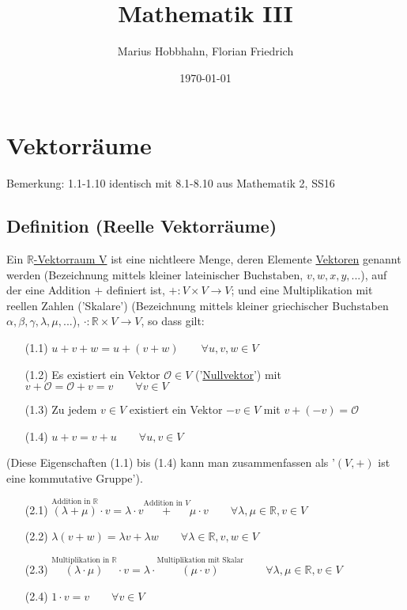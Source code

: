 \documentclass[12pt,titlepage, pdf]{article}
\title{Mathematik III}
\date{\today}
\author{Marius Hobbhahn, Florian Friedrich}
\newcommand{\R}{\mathds{R}}
\renewcommand{\>}{\rightarrow}
\renewcommand{\*}{\cdot}
\renewcommand{\O}{\mathcal{O}}
\begin{document}
	\maketitle
	\tableofcontents
	\newpage
	\section{Vektorräume}
	\small{Bemerkung: 1.1-1.10 identisch mit 8.1-8.10 aus Mathematik 2, SS16}
	\subsection{Definition (Reelle Vektorräume)}
	\label{1.1}
	Ein \underline{$\R$-Vektorraum V} ist eine nichtleere Menge, deren Elemente \underline{Vektoren} genannt werden (Bezeichnung mittels kleiner lateinischer Buchstaben, $v,w,x,y,...$), auf der eine Addition $+$ definiert ist, $+\colon V\times V\>V$; und eine Multiplikation mit reellen Zahlen ('Skalare') (Bezeichnung mittels kleiner griechischer Buchstaben $\alpha, \beta, \gamma, \lambda,\mu,...$), $\*\colon\R\times V\>V$, so dass gilt:
	\begin{itemize}
		\item[(1.1)] \label{1.1(1.1)}$u+v+w=u+(v+w)\qquad\forall u,v,w\in V$
		\item[(1.2)] \label{1.1(1.2)}Es existiert ein Vektor $\O\in V$ ('\underline{Nullvektor}') mit $v+\O=\O+v=v\qquad\forall v\in V$
		\item[(1.3)] \label{1.1(1.3)} Zu jedem $v\in V$ existiert ein Vektor $-v\in V$ mit $v+(-v)=\O$
		\item[(1.4)] $u+v=v+u\qquad\forall u,v\in V$
	\end{itemize}
	(Diese Eigenschaften (1.1) bis (1.4) kann man zusammenfassen als '$(V,+)$ ist eine kommutative Gruppe').
	\begin{itemize}
		\item[(2.1)] \label{1.1(2.1)}$\overset{\textrm{Addition in }\R}{(\lambda+\mu)}\*v=\lambda\*v\overset{\textrm{Addition in }V}{+}\mu\*v\qquad\forall\lambda,\mu\in\R,v\in V$
		\item[(2.2)] $\lambda(v+w)=\lambda v+\lambda w\qquad\forall\lambda\in\R,v,w\in V$
		\item[(2.3)] $\overset{\textrm{Multiplikation in }\R}{(\lambda\*\mu)}\*v=\lambda\*\overset{\textrm{Multiplikation mit Skalar}}{(\mu\*v)}\qquad\forall\lambda,\mu\in\R,v\in V$
		\item[(2.4)] $1\*v=v\qquad\forall v\in V$
	\end{itemize}
\end{document}
